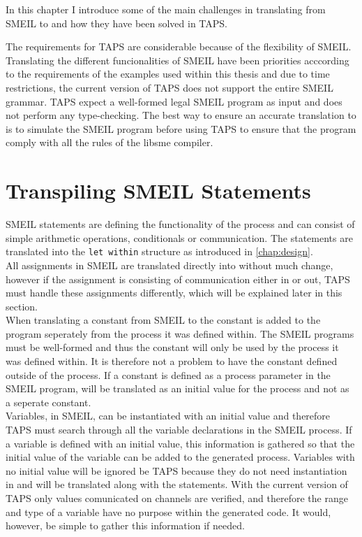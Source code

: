 In this chapter I introduce some of the main challenges in translating from SMEIL to \cspm{} and how they have been solved in TAPS.

The requirements for TAPS are considerable because of the flexibility of SMEIL. Translating the different funcionalities of SMEIL have been priorities acccording to the requirements of the examples used within this thesis and due to time restrictions, the current version of TAPS does not support the entire SMEIL grammar. TAPS expect a well-formed legal SMEIL program as input and does not perform any type-checking. The best way to ensure an accurate translation to \cspm{} is to simulate the SMEIL program before using TAPS to ensure that the program comply with all the rules of the libsme compiler.
\section{Transpiling SMEIL Statements}
SMEIL statements are defining the functionality of the process and can consist of simple arithmetic operations, conditionals or communication.
The statements are translated into the \texttt{let within} structure as introduced in \ref{chap:design}.\\

All assignments in SMEIL are translated directly into \cspm{} without much change, however if the assignment is consisting of communication either in or out, TAPS must handle these assignments differently, which will be explained later in this section.\\
When translating a constant from SMEIL to \cspm{} the constant is added to the \cspm{} program seperately from the process it was defined within.
The SMEIL programs must be well-formed and thus the constant will only be used by the process it was defined within. It is therefore not a problem to have the constant defined outside of the \cspm{} process. If a constant is defined as a process parameter in the SMEIL program, will be translated as an initial value for the process and not as a seperate \cspm{} constant.\\

Variables, in SMEIL, can be instantiated with an initial value and therefore TAPS must search through all the variable declarations in the SMEIL process. If a variable is defined with an initial value, this information is gathered so that the initial value of the variable can be added to the generated \cspm{} process.
Variables with no initial value will be ignored be TAPS because they do not need instantiation in \cspm{} and will be translated along with the statements. With the current version of TAPS only values comunicated on channels are verified, and therefore the range and type of a variable have no purpose within the generated \cspm{} code. It would, however, be simple to gather this information if needed.\\

